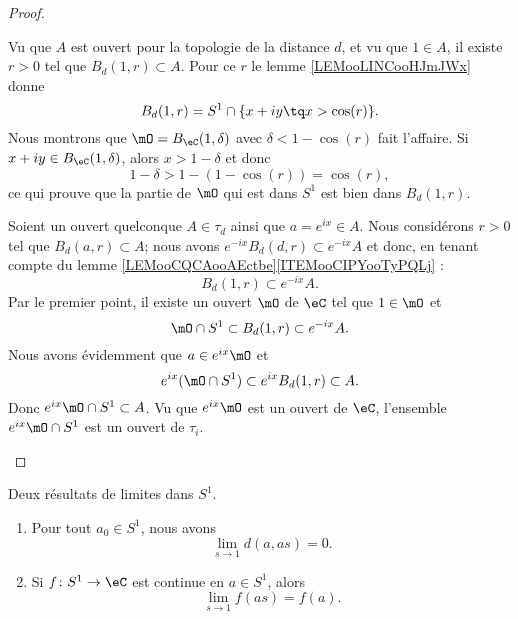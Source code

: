 \begin{proof}
\begin{subproof}
		\begin{subproof}
			\spitem[Si \( a=1\)]
			Vu que \( A\) est ouvert pour la topologie de la distance \( d\), et vu que \( 1\in A\), il existe \( r>0\) tel que \( B_d(1,r)\subset A\). Pour ce \( r\) le lemme \ref{LEMooLINCooHJmJWx} donne
			\begin{equation}
				B_d(1,r)=S^1\cap\{ x+iy\tq x>\cos(r) \}.
			\end{equation}
			Nous montrons que \( \mO=B_{\eC}(1,\delta)\) avec \( \delta<1-\cos(r)\) fait l'affaire. Si \( x+iy\in B_{\eC}(1,\delta)\), alors \( x>1-\delta\) et donc
			\begin{equation}
				1-\delta>1-(1-\cos(r))=\cos(r),
			\end{equation}
			ce qui prouve que la partie de \( \mO\) qui est dans \( S^1\) est bien dans \( B_d(1,r)\).
			\spitem[Si \( a\neq 1\)]

			Soient un ouvert quelconque \( A\in\tau_d\) ainsi que \( a= e^{ix}\in A\). Nous considérons \( r>0\) tel que \( B_d(a,r)\subset A\); nous avons \(  e^{-ix}B_d(d,r)\subset  e^{-ix}A\) et donc, en tenant compte du lemme \ref{LEMooCQCAooAEctbe}\ref{ITEMooCIPYooTyPQLj} :
			\begin{equation}
				B_d(1,r)\subset  e^{-ix}A.
			\end{equation}
			Par le premier point, il existe un ouvert \( \mO\) de \( \eC\) tel que \( 1\in \mO\) et
			\begin{equation}
				\mO\cap S^1\subset B_d(1,r)\subset  e^{-ix}A.
			\end{equation}
			Nous avons évidemment que \( a\in e^{ix}\mO\) et
			\begin{equation}
				e^{ix}(\mO\cap S^1)\subset  e^{ix}B_d(1,r)\subset A.
			\end{equation}
			Donc \(  e^{ix}\mO\cap S^1\subset A\). Vu que \(  e^{ix}\mO\) est un ouvert de \( \eC\), l'ensemble \(  e^{ix}\mO\cap S^1\) est un ouvert de \( \tau_i\).
		\end{subproof}
	\end{subproof}
\end{proof}

\begin{lemma}        \label{LEMooTKFHooJaeMyc}
	Deux résultats de limites dans \( S^1\).
	\begin{enumerate}
		\item       \label{ITEMooEUDIooDuynRg}
		      Pour tout \( a_0\in S^1\), nous avons
		      \begin{equation}
			      \lim_{s\to 1} d(a,as)=0.
		      \end{equation}
		\item       \label{ITEMooXCBUooUxQldB}
		      Si \( f\colon S^1\to \eC\) est continue en \( a\in S^1\), alors
		      \begin{equation}
			      \lim_{s\to 1} f(as)=f(a).
		      \end{equation}
	\end{enumerate}
\end{lemma}

